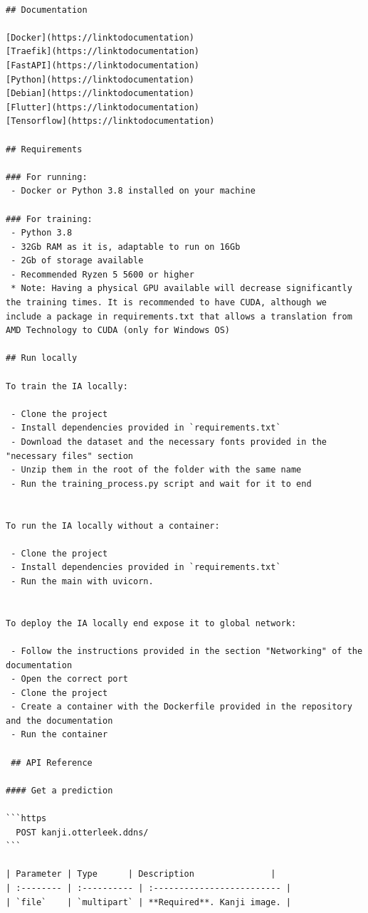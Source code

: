 \documentclass{article}
\begin{document}
\begin{lstlisting}

## Documentation

[Docker](https://linktodocumentation)
[Traefik](https://linktodocumentation)
[FastAPI](https://linktodocumentation)
[Python](https://linktodocumentation)
[Debian](https://linktodocumentation)
[Flutter](https://linktodocumentation)
[Tensorflow](https://linktodocumentation)

## Requirements

### For running:
 - Docker or Python 3.8 installed on your machine

### For training:
 - Python 3.8
 - 32Gb RAM as it is, adaptable to run on 16Gb
 - 2Gb of storage available
 - Recommended Ryzen 5 5600 or higher
 * Note: Having a physical GPU available will decrease significantly the training times. It is recommended to have CUDA, although we include a package in requirements.txt that allows a translation from AMD Technology to CUDA (only for Windows OS)

## Run locally

To train the IA locally:

 - Clone the project
 - Install dependencies provided in `requirements.txt`
 - Download the dataset and the necessary fonts provided in the "necessary files" section
 - Unzip them in the root of the folder with the same name
 - Run the training_process.py script and wait for it to end


To run the IA locally without a container:

 - Clone the project
 - Install dependencies provided in `requirements.txt`
 - Run the main with uvicorn.


To deploy the IA locally end expose it to global network:

 - Follow the instructions provided in the section "Networking" of the documentation
 - Open the correct port
 - Clone the project
 - Create a container with the Dockerfile provided in the repository and the documentation
 - Run the container

 ## API Reference

#### Get a prediction

```https
  POST kanji.otterleek.ddns/
```

| Parameter | Type    	| Description            	|
| :-------- | :---------- | :------------------------- |
| `file`	| `multipart` | **Required**. Kanji image. |


\end{lstlisting}
\end{document}
